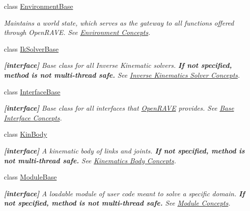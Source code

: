 \begin{DoxyCompactItemize}
class \hyperlink{classOpenRAVE_1_1EnvironmentBase}{EnvironmentBase}
\begin{DoxyCompactList}\small\item\em Maintains a world state, which serves as the gateway to all functions offered through OpenRAVE. See \hyperlink{architecture__concepts_arch_environment}{Environment Concepts}. \item\end{DoxyCompactList}\item 
class \hyperlink{classOpenRAVE_1_1IkSolverBase}{IkSolverBase}
\begin{DoxyCompactList}\small\item\em {\bfseries \mbox{[}interface\mbox{]}} Base class for all Inverse Kinematic solvers. {\bfseries If not specified, method is not multi-\/thread safe.} See \hyperlink{arch__iksolver}{Inverse Kinematics Solver Concepts}. \item\end{DoxyCompactList}\item 
class \hyperlink{classOpenRAVE_1_1InterfaceBase}{InterfaceBase}
\begin{DoxyCompactList}\small\item\em {\bfseries \mbox{[}interface\mbox{]}} Base class for all interfaces that \hyperlink{namespaceOpenRAVE}{OpenRAVE} provides. See \hyperlink{interface__concepts}{Base Interface Concepts}. \item\end{DoxyCompactList}\item 
class \hyperlink{classOpenRAVE_1_1KinBody}{KinBody}
\begin{DoxyCompactList}\small\item\em {\bfseries \mbox{[}interface\mbox{]}} A kinematic body of links and joints. {\bfseries If not specified, method is not multi-\/thread safe.} See \hyperlink{arch__kinbody}{Kinematics Body Concepts}. \item\end{DoxyCompactList}\item 
class \hyperlink{classOpenRAVE_1_1ModuleBase}{ModuleBase}
\begin{DoxyCompactList}\small\item\em {\bfseries \mbox{[}interface\mbox{]}} A loadable module of user code meant to solve a specific domain. {\bfseries If not specified, method is not multi-\/thread safe.} See \hyperlink{arch__module}{Module Concepts}. \item\end{DoxyCompactList}\item 

\end{DoxyCompactItemize}
